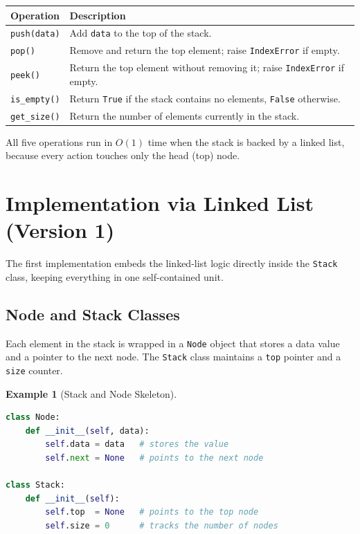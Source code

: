 \documentclass[11pt, a4paper, notitlepage]{report}
\theoremstyle{definition}
\theoremstyle{remark}
\theoremstyle{definition}
\newtheorem{example}[theorem]{Example}
\begin{document}
\begin{center}
\begin{tabularx}{\linewidth}{lX}
\toprule
\textbf{Operation} & \textbf{Description} \\
\midrule
\texttt{push(data)} & Add \texttt{data} to the top of the stack. \\
\texttt{pop()} & Remove and return the top element; raise \texttt{IndexError} if empty. \\
\texttt{peek()} & Return the top element without removing it; raise \texttt{IndexError} if empty. \\
\texttt{is\_empty()} & Return \texttt{True} if the stack contains no elements, \texttt{False} otherwise. \\
\texttt{get\_size()} & Return the number of elements currently in the stack. \\
\bottomrule
\end{tabularx}
\end{center}

All five operations run in $O(1)$ time when the stack is backed by a linked list,
because every action touches only the head (top) node.

\section{Implementation via Linked List (Version 1)}
\label{sec:stack-impl-v1}

The first implementation embeds the linked-list logic directly inside the
\texttt{Stack} class, keeping everything in one self-contained unit.

\subsection{Node and Stack Classes}
\label{subsec:stack-v1-classes}

Each element in the stack is wrapped in a \texttt{Node} object that stores a
data value and a pointer to the next node. The \texttt{Stack} class maintains
a \texttt{top} pointer and a \texttt{size} counter.

\begin{example}[Stack and Node Skeleton]
\label{ex:stack-skeleton}
\leavevmode
\begin{lstlisting}[language=Python]
class Node:
    def __init__(self, data):
        self.data = data   # stores the value
        self.next = None   # points to the next node

class Stack:
    def __init__(self):
        self.top  = None   # points to the top node
        self.size = 0      # tracks the number of nodes
\end{lstlisting}
\end{example}
\end{document}
